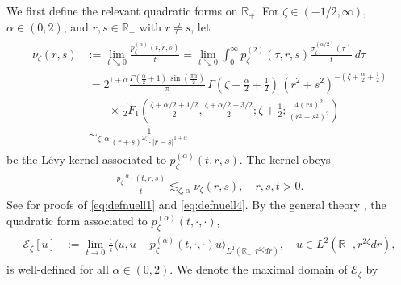 \documentclass[12pt,reqno]{amsart}
\theoremstyle{definition}
\theoremstyle{remark}
\numberwithin{equation}{section}
\newcommand{\1}{\mathbbm{1}}
\newcommand{\R}{\mathbb{R}}
\def\ce{\mathcal{E}}
\begin{document}
We first define the relevant quadratic forms on $\R_+$.
For $\zeta\in(-1/2,\infty)$, $\alpha\in(0,2)$, and $r,s\in\R_+$ with $r\neq s$, let
\begin{align}
  \label{eq:defnuell1}
  \begin{split}
    \nu_{\zeta}(r,s)
    & := \lim_{t\searrow0}\frac{p_\zeta^{(\alpha)}(t,r,s)}{t}
      = \lim_{t\searrow0} \int_0^\infty p_\zeta^{(2)}(\tau,r,s)\frac{\sigma_t^{(\alpha/2)}(\tau)}{t}\,d\tau \\
    & \ = 2^{1+\alpha} \frac{\Gamma\left(\frac\alpha2+1\right)\,\sin\left(\frac{\pi\alpha}{2}\right)}{\pi}\, \Gamma\left(\zeta+\frac\alpha2+\frac12\right)\, (r^2+s^2)^{-(\zeta+\frac\alpha2+\frac12)} \\
    & \qquad \times\, _2\tilde F_1\left(\frac{\zeta+\alpha/2+1/2}{2}, \frac{\zeta+\alpha/2+3/2}{2}; \zeta+\frac12; \frac{4(rs)^2}{(r^2+s^2)^2}\right) \\
    & \ \sim_{\zeta,\alpha} \frac{1}{(r+s)^{2\zeta} \cdot |r-s|^{1+\alpha}}
  \end{split}
\end{align}
be the L\'evy kernel associated to $p_\zeta^{(\alpha)}(t,r,s)$. The kernel obeys
\begin{align}
  \label{eq:defnuell4}
  \frac{p_\zeta^{(\alpha)}(t,r,s)}{t}
  \lesssim_{\zeta,\alpha} \nu_{\zeta}(r,s), \quad r,s,t>0.
\end{align}
See \cite[Proposition~2.4]{BogdanMerz2024} for proofs of \eqref{eq:defnuell1} and \eqref{eq:defnuell4}.
By the general theory \cite[Section~1.3]{Fukushimaetal2011}, the quadratic form associated to $p_\zeta^{(\alpha)}(t,\cdot,\cdot)$,
\begin{align}
  \label{eq:defezeta}
  \begin{split}
    \ce_\zeta[u]
    & := \lim_{t\to0}\frac1t\langle u,u-p_\zeta^{(\alpha)}(t,\cdot,\cdot)u\rangle_{L^2(\R_+,r^{2\zeta}dr)},\quad u\in L^2(\R_+,r^{2\zeta}dr),
  \end{split}
\end{align}\index{$\ce_\zeta$}is well-defined for all $\alpha\in(0,2)$. We denote the maximal domain of $\ce_\zeta$ by
\end{document}
